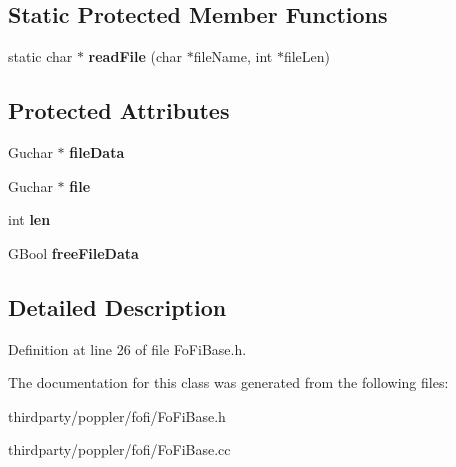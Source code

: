 \subsection*{Static Protected Member Functions}
\begin{DoxyCompactItemize}
\item 
\mbox{\label{class_fo_fi_base_a9753c5b43cf91c61c74f5ebe2ea6873e}} 
static char $\ast$ {\bfseries read\+File} (char $\ast$file\+Name, int $\ast$file\+Len)
\end{DoxyCompactItemize}
\subsection*{Protected Attributes}
\begin{DoxyCompactItemize}
\item 
\mbox{\label{class_fo_fi_base_a5518a597dde814b08d3b7449e5f20fb8}} 
Guchar $\ast$ {\bfseries file\+Data}
\item 
\mbox{\label{class_fo_fi_base_a4568cdd79f23c268224b942fa596619f}} 
Guchar $\ast$ {\bfseries file}
\item 
\mbox{\label{class_fo_fi_base_a70bed6964d934892eb7803e313b8d734}} 
int {\bfseries len}
\item 
\mbox{\label{class_fo_fi_base_a6877a78924b1197e85d07aff4ff1a5ad}} 
G\+Bool {\bfseries free\+File\+Data}
\end{DoxyCompactItemize}


\subsection{Detailed Description}


Definition at line 26 of file Fo\+Fi\+Base.\+h.



The documentation for this class was generated from the following files\+:\begin{DoxyCompactItemize}
\item 
thirdparty/poppler/fofi/Fo\+Fi\+Base.\+h\item 
thirdparty/poppler/fofi/Fo\+Fi\+Base.\+cc\end{DoxyCompactItemize}
